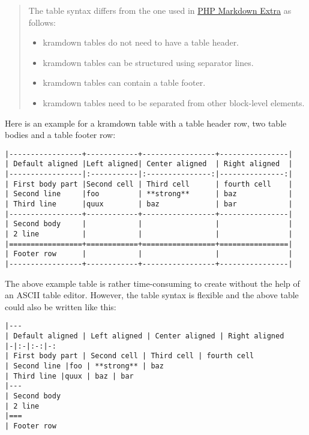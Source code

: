 \documentclass[a4paper]{article}
\begin{document}
\begin{quote}
The table syntax differs from the one used in
\href{http://michelf.com/projects/php-markdown/extra/}{PHP Markdown
Extra} as follows:

\begin{itemize}
\item
  kramdown tables do not need to have a table header.
\item
  kramdown tables can be structured using separator lines.
\item
  kramdown tables can contain a table footer.
\item
  kramdown tables need to be separated from other block-level elements.
\end{itemize}
\end{quote}

Here is an example for a kramdown table with a table header row, two
table bodies and a table footer row:

\begin{verbatim}
|-----------------+------------+-----------------+----------------|
| Default aligned |Left aligned| Center aligned  | Right aligned  |
|-----------------|:-----------|:---------------:|---------------:|
| First body part |Second cell | Third cell      | fourth cell    |
| Second line     |foo         | **strong**      | baz            |
| Third line      |quux        | baz             | bar            |
|-----------------+------------+-----------------+----------------|
| Second body     |            |                 |                |
| 2 line          |            |                 |                |
|=================+============+=================+================|
| Footer row      |            |                 |                |
|-----------------+------------+-----------------+----------------|
\end{verbatim}

The above example table is rather time-consuming to create without the
help of an ASCII table editor. However, the table syntax is flexible and
the above table could also be written like this:

\begin{verbatim}
|---
| Default aligned | Left aligned | Center aligned | Right aligned
|-|:-|:-:|-:
| First body part | Second cell | Third cell | fourth cell
| Second line |foo | **strong** | baz
| Third line |quux | baz | bar
|---
| Second body
| 2 line
|===
| Footer row
\end{verbatim}
\end{document}

